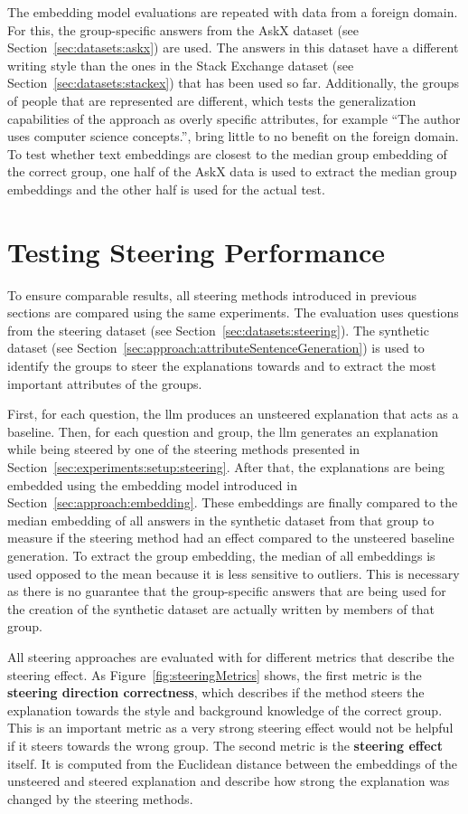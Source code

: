 The embedding model evaluations are repeated with data from a foreign domain. For this, the group-specific answers from the AskX %
dataset (see Section~\ref{sec:datasets:askx}) are used. The answers in this dataset have a different writing style than the ones in the Stack Exchange dataset (see Section~\ref{sec:datasets:stackex}) that has been used so far. Additionally, the groups of people that are represented are different, which tests the generalization capabilities of the approach as overly specific attributes, for example \enquote{The author uses computer science concepts.}, bring little to no benefit on the foreign domain. To test whether text embeddings are closest to the median group embedding of the correct group, one half of the AskX data is used to extract the median group embeddings and the other half is used for the actual test.

\section{Testing Steering Performance}
\label{sec:experiments:steering}
To ensure comparable results, all steering methods introduced in previous sections are compared using the same experiments. The evaluation uses questions from the steering dataset (see Section~\ref{sec:datasets:steering}). The synthetic dataset (see Section~\ref{sec:approach:attributeSentenceGeneration}) is used to identify the groups to steer the explanations towards and to extract the most important attributes of the groups.

First, for each question, the \ac{llm} produces an unsteered explanation that acts as a baseline.
Then, for each  question and group, the \ac{llm} generates an explanation while being steered by one of the steering methods presented in Section~\ref{sec:experiments:setup:steering}. After that, the explanations are being embedded using the embedding model introduced in Section~\ref{sec:approach:embedding}. These embeddings are finally compared to the median embedding of all answers in the synthetic dataset from that group to measure if the steering method had an effect compared to the unsteered baseline generation.
To extract the group embedding, the median of all embeddings is used opposed to the mean because it is less sensitive to outliers. This is necessary as there is no guarantee that the group-specific answers that are being used for the creation of the synthetic dataset are actually written by members of that group.

All steering approaches are evaluated with for different metrics that describe the steering effect. As Figure~\ref{fig:steeringMetrics} shows, the first metric is the \textbf{steering direction correctness}, which describes if the method steers the explanation towards the style and background knowledge of the correct group. This is an important metric as a very strong steering effect would not be helpful if it steers towards the wrong group. The second metric is the \textbf{steering effect} itself. It is computed from the Euclidean distance between the embeddings of the unsteered and steered explanation and describe how strong the explanation was changed by the steering methods.

